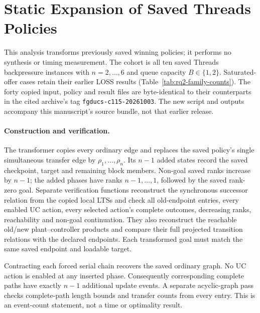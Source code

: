 \section{Static Expansion of Saved Threads Policies}\label{ta:saved-serial-expansion}
This analysis transforms previously saved winning policies; it performs no synthesis or timing measurement. The cohort is all ten saved Threads backpressure instances with $n=2,\ldots,6$ and queue capacity $B\in\{1,2\}$. Saturated-offer cases retain their earlier LOSS results (Table~\ref{tab:rq2-family-counts}). The forty copied input, policy and result files are byte-identical to their counterparts in the cited archive's tag \texttt{fgducs-c115-20261003}. The new script and outputs accompany this manuscript's source bundle, not that earlier release.

\paragraph{Construction and verification.}
The transformer copies every ordinary edge and replaces the saved policy's single simultaneous transfer edge by $\rho_1,\ldots,\rho_n$. Its $n-1$ added states record the saved checkpoint, target and remaining block members. Non-goal saved ranks increase by $n-1$; the added phases have ranks $n-1,\ldots,1$, followed by the saved rank-zero goal. Separate verification functions reconstruct the synchronous successor relation from the copied local LTSs and check all old-endpoint entries, every enabled UC action, every selected action's complete outcomes, decreasing ranks, reachability and non-goal continuation. They also reconstruct the reachable old/new plant--controller products and compare their full projected transition relations with the declared endpoints. Each transformed goal must match the same saved endpoint and loadable target.

Contracting each forced serial chain recovers the saved ordinary graph. No UC action is enabled at any inserted phase. Consequently corresponding complete paths have exactly $n-1$ additional update events. A separate acyclic-graph pass checks complete-path length bounds and transfer counts from every entry. This is an event-count statement, not a time or optimality result.


